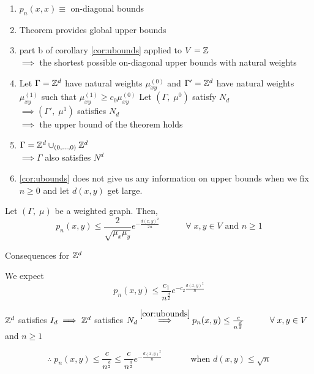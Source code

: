 \documentclass[main]{subfiles}
\begin{document}
\begin{remark}
	\begin{enumerate}
		\item $p_n(x,x) \equiv$ on-diagonal bounds
		\item Theorem provides global upper bounds
		\item part b of corollary \ref{cor:ubounds} applied to $V = \mathbb Z$\\
		      $\implies$ the shortest possible on-diagonal upper bounds with natural weights
		\item Let $\Gamma = \mathbb Z^d$ have natural weights $\mu_{xy}^{(0)}$ and $\Gamma' = \mathbb Z^d$ have natural weights $\mu_{xy}^{(1)}$ such that $\mu_{xy}^{(1)} \geq c_0 \mu_{xy}^{(0)}$
		      Let $(\Gamma,\;\mu^0)$ satisfy $N_d$\\
		      $\implies (\Gamma',\;\mu^1)$ satisfies $N_d$\\
		      $\implies$ the upper bound of the theorem holds
		\item $\Gamma = \mathbb Z^d \cup_{(0, \ldots, 0)} \mathbb Z^d$\\
		      $\implies \Gamma$ also satisfies $N^d$
		\item \ref{cor:ubounds} does not give us any information on upper bounds when we fix $n \geq 0$ and let $d(x,y)$ get large.
	\end{enumerate}
\end{remark}
\begin{theorem}
	Let $(\Gamma,\;\mu)$ be a weighted graph. Then,
	\[p_n(x,y) \leq \frac{2}{\sqrt{\mu_x\mu_y}}e^{-\frac{d(x,y)^2}{2n}} \hspace{3em} \forall\;x,y \in V\text{ and }n \geq 1\]
\end{theorem}
\ex Consequences for $\mathbb Z^d$

We expect
\[p_n(x,y) \leq \frac{c_1}{n^\frac{d}{2}}e^{-c_2\frac{d(x,y)^2}{n}}\]

$\mathbb Z^d$ satisfies $I_d \implies \mathbb Z^d$ satisfies $N_d \stackrel{\ref{cor:ubounds}}{\implies} p_n(x,y) \leq \frac{c}{n^\frac{d}{2}} \hspace{3em} \forall\; x,y \in V$ and $n \geq 1$

\[\therefore\;p_n(x,y) \leq \frac{c}{n^\frac{d}{2}} \leq \frac{c}{n^\frac{d}{2}} e^{-\frac{d(x,y)^2}{n}} \hspace{3em}\text{ when }d(x,y)\leq\sqrt{n}\]
\end{document}
